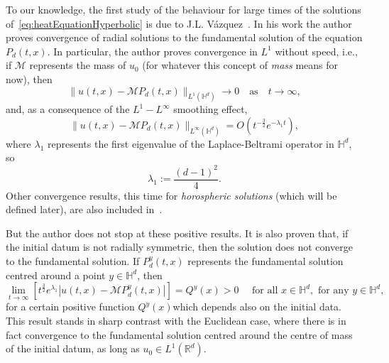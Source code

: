 \documentclass[12pt,longbibliography]{article}
\def\R{\mathbb{R}}
\def\R{\mathbb{R}}
\def\H{\mathbb{H}}
\theoremstyle{definition}
\theoremstyle{remark}
\theoremstyle{example}
\begin{document}
To our knowledge, the first study of the behaviour for large times of the solutions of~\eqref{eq:heatEquationHyperbolic} is due to J.L. Vázquez~\cite{vazquez1992asymptotic}. In his work the author proves convergence of radial solutions to the fundamental solution of the equation $P_d(t,x)$. In particular, the author proves convergence in $L^1$ without speed, i.e., if $\mathcal{M}$ represents the mass of $u_0$ (for whatever this concept of \textit{mass} means for now), then
\[
\|u(t,x) -\mathcal{M} P_d(t,x)\|_{L^1(\H^d)}\to 0\quad\text{as}\quad t\to \infty,
\]
and, as a consequence of the $L^1-L^\infty$ smoothing effect,
\[
\|u(t,x) -\mathcal{M} P_d(t,x)\|_{L^\infty(\H^d)}= O(t^{-\frac{3}{2}} e^{-\lambda_1 t}),
\]
where $\lambda_1$ represents the first eigenvalue of the Laplace-Beltrami operator in $\H^d$, so
\begin{equation}\label{eq:definition_bottom_spectrum_laplacian}
	\lambda_1:=\frac{(d-1)^2}{4}.
\end{equation}
Other convergence results, this time for \textit{horospheric solutions} (which will be defined later), are also included in~\cite{vazquez1992asymptotic}.

But the author does not stop at these positive results. It is also proven that, if the initial datum is not radially symmetric, then the solution does not converge to the fundamental solution. If $P^y_d(t,x)$ represents the fundamental solution centred around a point $y\in\H^d$, then
\[
\lim\limits_{t\to\infty} \left[t^{\frac{3}{2}} e^{\lambda_1}|u(t,x) -\mathcal{M} P^y_d(t,x)|\right]= Q^y(x)>0\quad\text{ for all }x\in\H^d, \text{ for any } y\in\H^d,
\]
for a certain positive function $Q^y(x)$which depends also on the initial data. This result stands in sharp contrast with the Euclidean case, where there is in fact convergence to the fundamental solution centred around the centre of mass of the initial datum, as long as $u_0\in L^1(\R^d)$.
\end{document}
